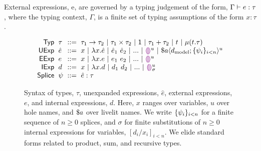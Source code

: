 External expressions, e, are governed by a typing judgement of the form, $\Gamma \vdash e : \tau$,
where the typing context, $\Gamma$,
is a finite set of typing assumptions of the form $x : \tau$ \cite{pfpl}.
\begin{figure}
    \vspace{-3px}
    \[
    \arraycolsep=3pt\begin{array}{rlcl}
        \mathsf{Typ} & \tau & ::= &
                                    \tarr{\tau_1}{\tau_2} ~\vert~
                                    \tprod{\tau_1}{\tau_2} ~\vert~
                                    \tunit ~\vert~
                                    \tsum{\tau_1}{\tau_2} ~\vert~
                                    t ~\vert~
                                    \trec{t}{\tau}\\
        \mathsf{UExp} & \hat{e} & ::= & 
                                 x ~\vert~
                                 \hlam{x}{\hat e} ~\vert~
                                 \hap{\hat e_1}{\hat e_2} ~\vert~
                                 ... ~\vert~
                                 \hehole{u} ~\vert~
                                 \haplivelit{u}{a}{\dtxt{model}}{\splices}\\
        \mathsf{EExp} & e & ::= & x ~\vert~ \hlam{x}{e} ~\vert~ \hap{e_1}{e_2} ~\vert~ ... ~\vert~ \hehole{u}\\
        \mathsf{IExp} & d & ::= & x ~\vert~ \hlam{x}{d} ~\vert~ \hap{d_1}{d_2} ~\vert~ ... ~\vert~ \dehole{u}{\sigma}\\
        \mathsf{Splice} & \psi & ::= & \hsplice{\hat e}{\tau}
    \end{array}\]
    \caption{Syntax of types, $\tau$, unexpanded expressions, $\hat{e}$, external expressions, $e$, and internal expressions, $d$.
    Here, $x$ ranges over variables, $u$ over hole names, and $\$a$ over livelit names.
    We write $\{\psi_i\}_{i < n}$ for a finite sequence of $n \geq 0$ splices,
    and $\sigma$ for finite substitutions of $n \geq 0$ internal expressions for variables, $[d_i/x_i]_{i < n}$.
    We elide standard forms
    related to product, sum, and recursive types.
    }
    \label{fig:syntax}
    \end{figure}

